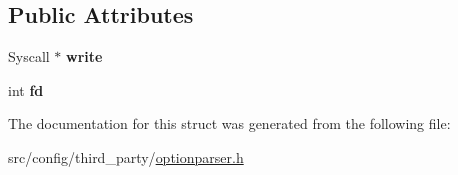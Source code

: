 \subsection*{Public Attributes}
\begin{DoxyCompactItemize}
\item 
\hypertarget{structxmem_1_1config_1_1third__party_1_1_print_usage_implementation_1_1_syscall_writer_a437e8105a1e0b45e514246caed539664}{}Syscall $\ast$ {\bfseries write}\label{structxmem_1_1config_1_1third__party_1_1_print_usage_implementation_1_1_syscall_writer_a437e8105a1e0b45e514246caed539664}

\item 
\hypertarget{structxmem_1_1config_1_1third__party_1_1_print_usage_implementation_1_1_syscall_writer_a9652df23c84135075bb5468bb39a7064}{}int {\bfseries fd}\label{structxmem_1_1config_1_1third__party_1_1_print_usage_implementation_1_1_syscall_writer_a9652df23c84135075bb5468bb39a7064}

\end{DoxyCompactItemize}


The documentation for this struct was generated from the following file\+:\begin{DoxyCompactItemize}
\item 
src/config/third\+\_\+party/\hyperlink{optionparser_8h}{optionparser.\+h}\end{DoxyCompactItemize}
